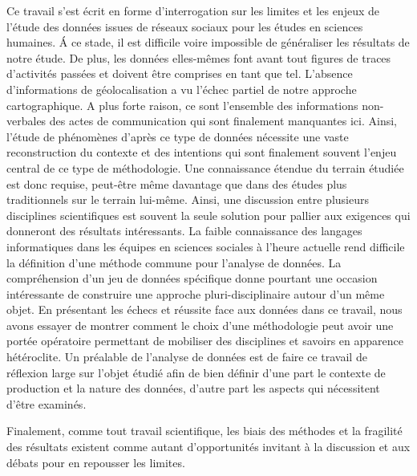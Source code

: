 Ce travail s'est écrit en forme d'interrogation sur les limites et les enjeux de l'étude des données issues de réseaux sociaux pour les études en sciences humaines. \'A ce stade, il est difficile voire impossible de généraliser les résultats de notre étude. De plus, les données elles-mêmes font avant tout figures de traces d{\textquoteright}activités passées et doivent être comprises en tant que tel. L'absence d'informations de géolocalisation a vu l'échec partiel de notre approche cartographique. A plus forte raison, ce sont l'ensemble des informations non-verbales des actes de communication qui sont finalement manquantes ici. Ainsi, l{\textquoteright}étude de phénomènes d'après ce type de données nécessite une vaste reconstruction du contexte et des intentions qui sont finalement souvent l'enjeu central de ce type de méthodologie. Une connaissance étendue du terrain étudiée est donc requise, peut-être même davantage que dans des études plus traditionnels sur le terrain lui-même. Ainsi, une discussion entre plusieurs disciplines scientifiques est souvent la seule solution pour pallier aux exigences qui donneront des résultats intéressants. La faible connaissance des langages informatiques dans les équipes en sciences sociales à l'heure actuelle \cite{Wieviorka2013} rend difficile la définition d'une méthode commune pour l'analyse de données. La compréhension d'un jeu de données spécifique donne pourtant une occasion intéressante de construire une approche pluri-disciplinaire autour d'un même objet. En présentant les échecs et réussite face aux données dans ce travail, nous avons essayer de montrer comment le choix d'une méthodologie peut avoir une portée opératoire permettant de mobiliser des disciplines et savoirs en apparence hétéroclite. Un préalable de l'analyse de données est de faire ce travail de réflexion large sur l'objet étudié afin de bien définir d'une part le contexte de production et la nature des données, d'autre part les aspects qui nécessitent d'être examinés.


Finalement, comme tout travail scientifique, les biais des méthodes et la fragilité des résultats existent comme autant d'opportunités invitant à la discussion et aux débats pour en repousser les limites.

